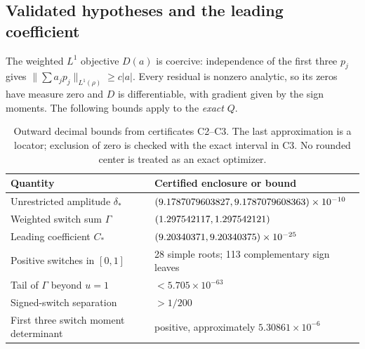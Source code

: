 \documentclass[11pt,a4paper]{article}
\numberwithin{equation}{section}
\theoremstyle{remark}\newtheorem{remark}[theorem]{Remark}
\newcommand{\ds}{\delta_*}
\newcommand{\Cs}{C_*}
\newcommand{\norm}[1]{\lVert#1\rVert}
\begin{document}
\subsection{Validated hypotheses and the leading coefficient}\label{sec:hypcert}
The weighted $L^1$ objective $D(a)$ is coercive: independence of the first
three $p_j$ gives $\norm{\sum a_jp_j}_{L^1(\rho)}\ge c|a|$.
Every residual is nonzero analytic, so its zeros have measure zero and
$D$ is differentiable, with gradient given by the sign moments.
The following bounds apply to the \emph{exact} $Q$.

\begin{table}[tbp]
\centering\small
\begin{tabular}{p{.40\linewidth}p{.52\linewidth}}
\toprule
Quantity & Certified enclosure or bound\\\midrule
Unrestricted amplitude $\ds$ & $(9.1787079603827,9.1787079608363)\times10^{-10}$\\
Weighted switch sum $\Gamma$ & $(1.297542117,1.297542121)$\\
Leading coefficient $\Cs$ & $(9.20340371,9.20340375)\times10^{-25}$\\
Positive switches in $[0,1]$ & 28 simple roots; 113 complementary sign leaves\\
Tail of $\Gamma$ beyond $u=1$ & $<5.705\times10^{-63}$\\
Signed-switch separation & $>1/200$\\
First three switch moment determinant & positive, approximately $5.30861\times10^{-6}$\\
\bottomrule
\end{tabular}
\caption{Outward decimal bounds from certificates C2--C3. The last
approximation is a locator; exclusion of zero is checked with the exact
interval in C3. No rounded center is treated as an exact optimizer.}
\label{tab:cert}
\end{table}
\end{document}
